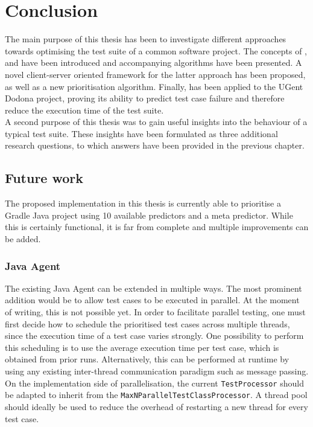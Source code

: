 
\chapter{Conclusion}

The main purpose of this thesis has been to investigate different approaches towards optimising the test suite of a common software project. The concepts of \tsm{}, \tcs{} and \tcp{} have been introduced and accompanying algorithms have been presented. A novel client-server oriented framework for the latter approach has been proposed, as well as a new prioritisation algorithm. Finally, \velocity{} has been applied to the UGent Dodona project, proving its ability to predict test case failure and therefore reduce the execution time of the test suite.\\

\noindent A second purpose of this thesis was to gain useful insights into the behaviour of a typical test suite. These insights have been formulated as three additional research questions, to which answers have been provided in the previous chapter.

\section{Future work}
The proposed \velocity{} implementation in this thesis is currently able to prioritise a Gradle Java project using 10 available predictors and a meta predictor. While this is certainly functional, it is far from complete and multiple improvements can be added.

\subsection{Java Agent}
The existing Java Agent can be extended in multiple ways. The most prominent addition would be to allow test cases to be executed in parallel. At the moment of writing, this is not possible yet. In order to facilitate parallel testing, one must first decide how to schedule the prioritised test cases across multiple threads, since the execution time of a test case varies strongly. One possibility to perform this scheduling is to use the average execution time per test case, which is obtained from prior runs. Alternatively, this can be performed at runtime by using any existing inter-thread communication paradigm such as message passing. On the implementation side of parallelisation, the current \texttt{TestProcessor} should be adapted to inherit from the \texttt{MaxNParallelTestClassProcessor}. A thread pool should ideally be used to reduce the overhead of restarting a new thread for every test case.

